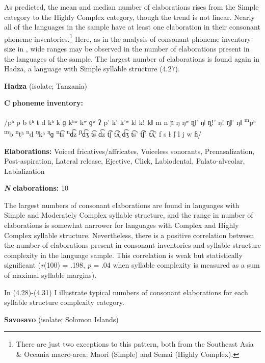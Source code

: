   As predicted, the mean and median number of elaborations rises from the Simple category to the Highly Complex category, though the trend is not linear. Nearly all of the languages in the sample have at least one elaboration in their consonant phoneme inventories.\footnote{ \textrm{There are just two exceptions to this pattern, both from the Southeast Asia \& Oceania macro-area: Maori (Simple) and Semai (Highly Complex).} } Here, as in the analysis of consonant phoneme inventory size in , wide ranges may be observed in the number of elaborations present in the languages of the sample. The largest number of elaborations is found again in Hadza, a language with Simple syllable structure (4.27).

\ea\label{ex:(4.27)}
  \textbf{Hadza} (isolate; Tanzania)

\textbf{C} \textbf{phoneme} \textbf{inventory:} 

/pʰ p b tʰ t d kʰ k ɡ kʰʷ kʷ ɡʷ ʔ p’ k’ k’ʷ kǀ kǃ kǁ m n ɲ ŋ ŋʷ ŋ̥ǀ’ ŋǀ ŋ̥ǃ’ ŋǃ ŋ̥ǁ’ ŋǁ \textsuperscript{m}pʰ \textsuperscript{m}b \textsuperscript{n}tʰ \textsuperscript{n}d \textsuperscript{ŋ}kʰ \textsuperscript{ŋ}ɡ \textsuperscript{n}t͡s \textsuperscript{n}d͡z \textsuperscript{ɲ}d͡ʒ t͡s d͡z t͡ʃ t͡ʎ̥ d͡ʒ t͡s’ t͡ʃ’ t͡ʎ̥’ f s ɬ ʃ l j w ɦ/

\textbf{Elaborations:} Voiced fricatives/affricates, Voiceless sonorants, Prenasalization, Post-aspiration, Lateral release, Ejective, Click, Labiodental, Palato-alveolar, Labialization

\textbf{\textit{N}} \textbf{elaborations:} 10

\z

  The largest numbers of consonant elaborations are found in languages with Simple and Moderately Complex syllable structure, and the range in number of elaborations is somewhat narrower for languages with Complex and Highly Complex syllable structure. Nevertheless, there is a positive correlation between the number of elaborations present in consonant inventories and syllable structure complexity in the language sample. This correlation is weak but statistically significant (\textit{r}(100) = .198, \textit{p} = .04 when syllable complexity is measured as a sum of maximal syllable margins).

  In (4.28)-(4.31) I illustrate typical numbers of consonant elaborations for each syllable structure complexity category.

\ea\label{ex:(4.28)}
  \textbf{Savosavo} (isolate; Solomon Islands)

